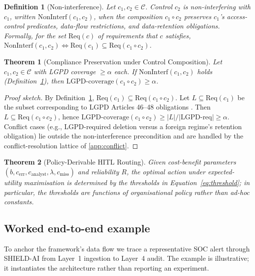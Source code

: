 \documentclass[preprint,12pt,authoryear]{elsarticle}
\newtheorem{definition}{Definition}
\newtheorem{theorem}{Theorem}
\begin{document}
\begin{definition}[Non-interference]
\label{def:nonint}
Let $c_1, c_2 \in \mathcal{C}$. Control $c_2$ is \emph{non-interfering} with $c_1$, written $\mathrm{NonInterf}(c_1, c_2)$, when the composition $c_1 \circ c_2$ preserves $c_1$'s access-control predicates, data-flow restrictions, and data-retention obligations. Formally, for the set $\mathrm{Req}(c)$ of requirements that $c$ satisfies, $\mathrm{NonInterf}(c_1, c_2) \iff \mathrm{Req}(c_1) \subseteq \mathrm{Req}(c_1 \circ c_2)$.
\end{definition}

\begin{theorem}[Compliance Preservation under Control Composition]
\label{thm:compliance}
Let $c_1, c_2 \in \mathcal{C}$ with LGPD coverage $\geq \alpha$ each. If $\mathrm{NonInterf}(c_1, c_2)$ holds (Definition~\ref{def:nonint}), then $\mathrm{LGPD\text{-}coverage}(c_1 \circ c_2) \geq \alpha$.
\end{theorem}
\begin{proof}[Proof sketch]
By Definition~\ref{def:nonint}, $\mathrm{Req}(c_1) \subseteq \mathrm{Req}(c_1 \circ c_2)$. Let $L \subseteq \mathrm{Req}(c_1)$ be the subset corresponding to LGPD Articles 46--48 obligations \citep{lgpd2018}. Then $L \subseteq \mathrm{Req}(c_1 \circ c_2)$, hence $\mathrm{LGPD\text{-}coverage}(c_1 \circ c_2) \geq |L|/|\text{LGPD-req}| \geq \alpha$. Conflict cases (e.g., LGPD-required deletion versus a foreign regime's retention obligation) lie outside the non-interference precondition and are handled by the conflict-resolution lattice of \ref{app:conflict}.
\end{proof}

\begin{theorem}[Policy-Derivable HITL Routing]
\label{thm:routing}
Given cost-benefit parameters $(b, c_{\text{err}}, c_{\text{analyst}}, \lambda, c_{\text{miss}})$ and reliability $R$, the optimal action under expected-utility maximisation is determined by the thresholds in Equation~\ref{eq:threshold}; in particular, the thresholds are functions of organisational policy rather than ad-hoc constants.
\end{theorem}

\subsection{Worked end-to-end example}
\label{ssec:worked}
To anchor the framework's data flow we trace a representative SOC alert through SHIELD-AI from Layer~1 ingestion to Layer~4 audit. The example is illustrative; it instantiates the architecture rather than reporting an experiment.
\end{document}
